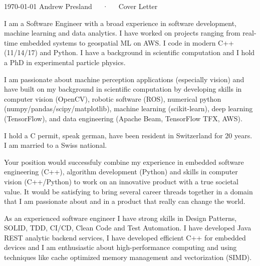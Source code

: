 \documentclass[11pt, a4paper]{awesome-cv}
\begin{document}
\makecvheader[R]

\makecvfooter
  {\today}
  {Andrew Presland~~~·~~~Cover Letter}
  {}

\makelettertitle

\begin{cvletter}

I am a Software Engineer with a broad experience 
in software development, machine learning and data analytics. I have 
worked on projects ranging from real-time embedded systems to geospatial ML on AWS.
I code in modern C++ (11/14/17) and Python. I have a background in scientific computation and
I hold a PhD in experimental particle physics.

I am passionate about machine perception applications (especially vision) and have
built on my background in scientific computation by developing skills 
in computer vision (OpenCV), robotic software (ROS), numerical python (numpy/pandas/scipy/matplotlib), machine learning (scikit-learn), deep learning (TensorFlow),
and data engineering (Apache Beam, TensorFlow TFX, AWS).

I hold a C permit, 
speak german, have been resident in Switzerland for 20 years.
I am married to a Swiss national.

Your position would successfuly combine my experience in embedded software engineering
(C++), algorithm development (Python) and skills in computer vision (C++/Python) to 
work on an innovative product with a true societal value. It would be satisfying to 
bring several career threads together in a domain that I am passionate about and
in a product that really can change the world.



As an experienced software engineer I have strong skills in 
Design Patterns, SOLID, TDD, CI/CD, Clean Code and Test Automation.
I have developed Java REST analytic backend services, I 
have developed efficient C++ for embedded devices and
I am enthusiastic about high-performance computing and using 
techniques like cache optimized memory management 
and vectorization (SIMD).


\end{cvletter}
\end{document}
